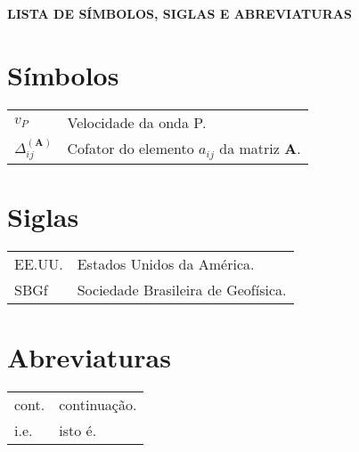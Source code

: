 \thispagestyle{empty} 
\begin{center} 
\normalfont\bfseries {\large LISTA DE S\'IMBOLOS, SIGLAS E ABREVIATURAS}
\end{center}


\section*{S\'imbolos}

\begin{tabular}{ll}
 $v_P$ & Velocidade da onda P. \\
 $\Delta^{(\mathbf{A})}_{ij}$ & Cofator do elemento $a_{ij}$ da matriz $\mathbf{A}$.
\end{tabular}

\section*{Siglas}

\begin{tabular}{ll}
 EE.UU. & Estados Unidos da Am\'erica. \\
 SBGf & Sociedade Brasileira de Geof\'isica.
\end{tabular}

\section*{Abreviaturas}

\begin{tabular}{ll}
 cont. & continua\c{c}\~ao. \\
 i.e. & isto \'e. \\
\end{tabular}

